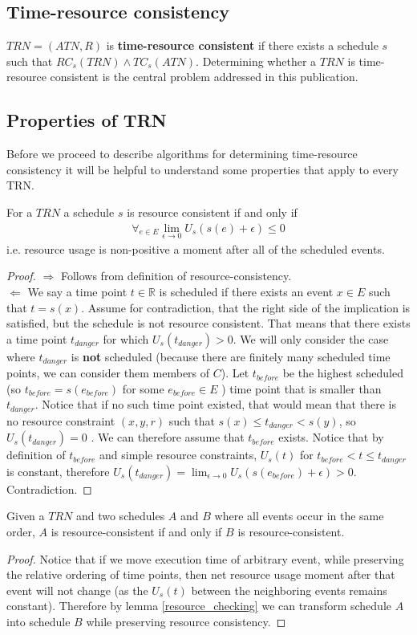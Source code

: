 \subsection{Time-resource consistency}
$TRN=(ATN, R)$ is \textbf{time-resource consistent} if there exists a schedule $s$ such that $RC_s(TRN) \wedge TC_s(ATN)$. Determining whether a $TRN$ is time-resource consistent is the central problem addressed in this publication.

\subsection{Properties of TRN}
Before we proceed to describe algorithms for determining time-resource consistency it will be helpful to understand some properties that apply to every TRN.
\begin{lemma}
\label{resource_checking}
For a $TRN$ a schedule $s$ is resource consistent if and only if
\begin{align}
\label{eq:resource_consistency}\forall_{e \in E} \lim_{\epsilon \to 0} U_s(s(e) + \epsilon) \leq 0
\end{align}
i.e. resource usage is non-positive a moment after all of the scheduled events.
\end{lemma}
\begin{proof}
$\Rightarrow$ Follows from definition of resource-consistency.\\
$\Leftarrow$ We say a time point $t \in \mathbb{R}$ is scheduled if there exists an event  $x \in E$ such that $t = s(x)$. Assume for contradiction, that the right side of the implication is satisfied, but the schedule is not resource consistent. That means that there exists a time point $t_{danger}$ for which $U_s(t_{danger}) > 0 $. We will only consider the case where $t_{danger}$ is \textbf{not} scheduled (because there are finitely many scheduled time points, we can consider them members of $C$). Let $t_{before}$ be the highest scheduled (so $t_{before}=s(e_{before})$ for some $e_{before} \in E$ ) time point that is smaller than $t_{danger}$. Notice that if no such time point existed, that would mean that there is no resource constraint $(x,y,r)$ such that $s(x) \leq t_{danger} < s(y)$, so $U_s(t_{danger})=0$ . We can therefore assume that $t_{before}$ exists. Notice that by definition of $t_{before}$ and simple resource constraints, $U_s(t)$ for $t_{before} < t \leq t_{danger}$ is constant, therefore $U_s(t_{danger}) = \lim_{\epsilon \to 0} U_s(s(e_{before}) + \epsilon) > 0$. Contradiction.
\end{proof}
\begin{corollary}
\label{cor:ordering}
Given a $TRN$ and two schedules $A$ and $B$ where all events occur in the same order, $A$ is resource-consistent if and only if $B$ is resource-consistent.
\end{corollary}
\begin{proof}
Notice that if we move execution time of arbitrary event, while preserving the relative ordering of time points, then net resource usage moment after that event will not change (as the $U_s(t)$ between the neighboring events remains constant). Therefore by lemma \ref{resource_checking} we can transform schedule $A$ into schedule $B$ while preserving resource consistency.
\end{proof}

